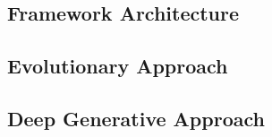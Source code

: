 \documentclass[./../../paper.tex]{subfiles}
\begin{document}
\subsection{Framework Architecture}
\subsection{Evolutionary Approach}
\subsection{Deep Generative Approach}
\end{document}
